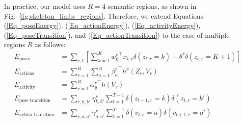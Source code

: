 \begin{comment}
The intuition behind our pose energy term is to add a fixed \emph{benefit} when
a frame does not belong to any dictionary entry. As all energy-based models, our
model will try to maximize the energy of the configuration of poses and atomic
actions; without the ``simulated score'' $\theta$, all frames are informative
and are part of the training of the pose dictionary during learning. As an
alternative, one could just omit certain frames, but this could produce balance
issues since some videos could have much more labeled frames than others, and
also we would need an additional step to select which frames are informative and
which are not. This is not the case in the presented model, as we are not
omitting frames;  instead, we are treating those frames labeled as \mbox{$K+1$}
as non-informative frames. Every non-informative frame adds a score $\theta$ to
the energy function, and the number of unlabeled frames of a video are used also
in the in the atomic action classifiers $\beta$ as a new item in the histogram
of poses relative to actions $h^{a}(Z,V)$. With this setup, our goal is that the
best poses will be selected to learn the pose classifiers, leaving the rest of
non-informative frames not feeding any pose classifier but participating in the
energy score. Note that in Equations (\ref{Eq_actionEnergy}) and
(\ref{Eq_poseTransition}), we use the pose \mbox{$K+1$} for non-informative
frames the same way as any other pose, including it in the atomic actions
energy and in the pose transition energy.
\end{comment}

In practice, our model uses $R=4$ semantic regions, as shown in Fig.~\ref{fig:skeleton_limbs_regions}.
Therefore, we extend Equations
(\ref{Eq_poseEnergy}), (\ref{Eq_actionEnergy}),  (\ref{Eq_activityEnergy}), 
(\ref{Eq_poseTransition}), and
(\ref{Eq_actionTransition}) to the case of multiple regions $R$ as follows:
\begin{align}
E_{\text{poses}} & =  \sum_{r,t} \left[ \sum_{k=1}^K {w^r_k}^\top x_{t,r}\delta(z_{t,r} = k) + 
\theta^r \delta(z_{t,r}=K+1)\right] \\
E_{\text{actions}} & = \sum_{r=1}^R \sum_{a=1}^A {\beta^r_{a}}^\top h^{a}(Z_r,V_r) \\
E_{\text{activity}} &=\sum_{r=1}^R {\alpha^r_{y}}^\top h(V_r) \\
E_{\text{pose transition}} & = \sum_{r,k,k'} \eta^r_{k,k'} \sum_{t=1}^{T-1} 
\delta(z_{t-1,r}=k)\delta(z_{t,r}=k')\\
E_{\text{action transition}} & =\sum_{r, a,a'} \gamma^r_{a,a'} \sum_{t=1}^{T-1} 
\delta(v_{t,r}=a)\delta(v_{t+1,r}=a') 
\end{align}
